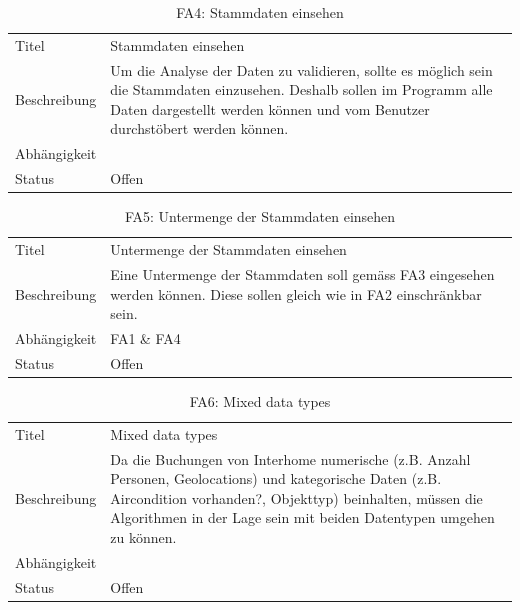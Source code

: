 \begin{table}[H] 
	\caption{FA4: Stammdaten einsehen}
	\centering
	\label{fig:anforderungsanalyse:funktionaleanforderung:fa4}
	\begin{tabular}{ | l | L{10cm} | } 
		\hline 
		 \\ \hline 
		Titel & Stammdaten einsehen \\ \hline 
		Beschreibung & Um die Analyse der Daten zu validieren, sollte es möglich sein die Stammdaten einzusehen. Deshalb sollen im Programm alle Daten dargestellt werden können und vom Benutzer durchstöbert werden können. \\ \hline 
		Abhängigkeit & \\ \hline 
		Status & Offen \\ \hline 
	\end{tabular}
\end{table}

\begin{table}[H] 
	\caption{FA5: Untermenge der Stammdaten einsehen}
	\centering
	\label{fig:anforderungsanalyse:funktionaleanforderung:fa5}
	\begin{tabular}{ | l | L{10cm} | } 
		\hline 
		 \\ \hline 
		Titel & Untermenge der Stammdaten einsehen \\ \hline 
		Beschreibung & Eine Untermenge der Stammdaten soll gemäss FA3 eingesehen werden können. Diese sollen gleich wie in FA2 einschränkbar sein.  \\ \hline 
		Abhängigkeit & FA1 \& FA4 \\ \hline 
		Status & Offen \\ \hline 
	\end{tabular}
\end{table}

\begin{table}[H] 
	\caption{FA6: Mixed data types}
	\centering
	\label{fig:anforderungsanalyse:funktionaleanforderung:fa6}
	\begin{tabular}{ | l | L{10cm} | } 
		\hline 
		 \\ \hline 
		Titel & Mixed data types \\ \hline 
		Beschreibung & Da die Buchungen von Interhome numerische (z.B. Anzahl Personen, Geolocations) und kategorische Daten (z.B. Aircondition vorhanden?, Objekttyp) beinhalten, müssen die Algorithmen in der Lage sein mit beiden Datentypen umgehen zu können. \\ \hline 
		Abhängigkeit & \\ \hline 
		Status & Offen \\ \hline 
	\end{tabular}
\end{table}

